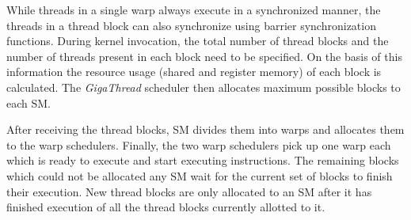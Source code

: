 While threads in a single warp always execute in a synchronized manner, the threads in a thread block can also synchronize using barrier synchronization functions. During kernel invocation, the total number of thread blocks and the number of threads present in each block need to be specified. On the basis of this information the resource usage (shared and register memory) of each block is calculated. The {\it GigaThread} scheduler then allocates maximum possible blocks to each SM.

After receiving the thread blocks, SM divides them into warps and allocates them to the warp schedulers. Finally, the two warp schedulers pick up one warp each which is ready to execute and start executing instructions. The remaining blocks which could not be allocated any SM wait for the current set of blocks to finish their execution. New thread blocks are only allocated to an SM after it has finished execution of all the thread blocks currently allotted to it.

